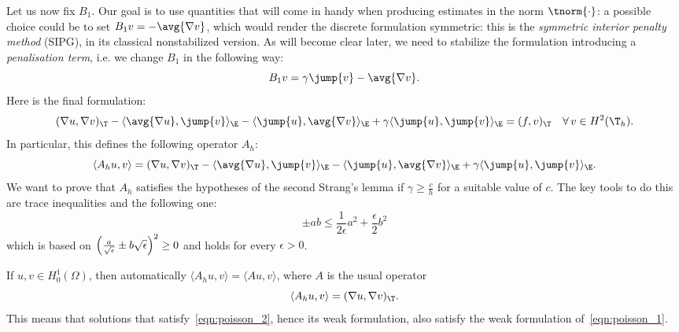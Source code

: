 Let us now fix $B_1$. Our goal is to use quantities that will come in handy when producing estimates in the norm $\tnorm{\cdot}$: a possible choice could be to set $B_1 v = - \avg{\nabla v}$, which would render the discrete formulation symmetric: this is the \emph{symmetric interior penalty method} (SIPG), in its classical nonstabilized version. As will become clear later, we need to stabilize the formulation introducing a \emph{penalisation term}, i.e. we change $B_1$ in the following way:
\[
B_1 v = \gamma \jump{v} - \avg{\nabla v}.
\]
Here is the final formulation:
\[
(\nabla u, \nabla v)_\T -
\langle \avg{\nabla u}, \jump{v} \rangle_{\E} -
\langle \jump{u}, \avg{\nabla v} \rangle_\E +
\gamma \langle \jump{u}, \jump{v} \rangle_\E =
(f,v)_\T \quad \forall \, v \in H^2(\T_h).
\]
In particular, this defines the following operator $A_h$:
\[
\langle A_h u, v \rangle = 
(\nabla u, \nabla v)_\T -
\langle \avg{\nabla u}, \jump{v} \rangle_{\E} -
\langle \jump{u}, \avg{\nabla v} \rangle_\E +
\gamma \langle \jump{u}, \jump{v} \rangle_\E.
\]
We want to prove that $A_h$ satisfies the hypotheses of the second Strang's lemma if $\gamma \ge \frac{c}{h}$ for a suitable value of $c$. The key tools to do this are trace inequalities and the following one:
\[
\pm ab \le \frac{1}{2\epsilon} a^2 + \frac{\epsilon}{2} b^2
\]
which is based on $\Bigl(\frac{a}{\sqrt{\epsilon}}\pm b\sqrt{\epsilon}\Bigr)^2 \ge 0$ and holds for every $\epsilon>0$.
\begin{remark}
    If $u,v \in H^1_0(\Omega)$, then automatically $\langle A_h u, v \rangle = \langle A u, v \rangle$, where $A$ is the usual operator
    \[
    \langle A_h u, v \rangle = (\nabla u, \nabla v)_\T.
    \]    
    This means that solutions that satisfy~\eqref{eqn:poisson_2}, hence its weak formulation, also satisfy the weak formulation of~\eqref{eqn:poisson_1}.
\end{remark}

